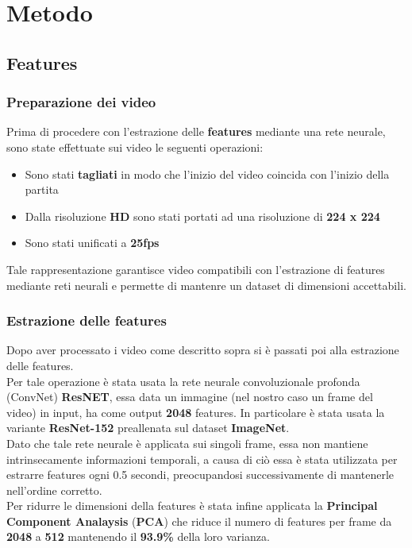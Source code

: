 \chapter{Metodo}\label{ch:chapter1}
\section{Features \cite{soccerNet}}
\subsection{Preparazione dei video }
Prima di procedere con l'estrazione delle \textbf{features} mediante una rete neurale, sono state effettuate sui video le seguenti operazioni:
\begin{itemize}
\item Sono stati \textbf{tagliati} in modo che l'inizio del video coincida con l'inizio della partita
\item Dalla risoluzione \textbf{HD} sono stati portati ad una risoluzione di \textbf{224 x 224}
\item Sono stati unificati a \textbf{25fps}
\end{itemize}
Tale rappresentazione garantisce video compatibili con l'estrazione di features mediante reti neurali e permette di mantenre un dataset di dimensioni accettabili.
\subsection{Estrazione delle features }
Dopo aver processato i video come descritto sopra si è passati poi alla estrazione delle features.
\\Per tale operazione è stata usata la rete neurale convoluzionale profonda (ConvNet) \textbf{ResNET}, essa data un immagine (nel nostro caso un frame del video) in input, ha come output \textbf{2048} features. In particolare è stata usata la variante \textbf{ResNet-152} preallenata sul dataset \textbf{ImageNet}.
\\Dato che tale rete neurale è applicata sui singoli frame, essa non mantiene intrinsecamente informazioni temporali, a causa di ciò essa è stata utilizzata per estrarre features ogni 0.5 secondi, preocupandosi successivamente di mantenerle nell'ordine corretto.
\\Per ridurre le dimensioni della features è stata infine applicata la \textbf{Principal Component Analaysis} (\textbf{PCA}) che riduce il numero di features per frame da \textbf{2048} a \textbf{512} mantenendo il \textbf{93.9\%} della loro varianza.

